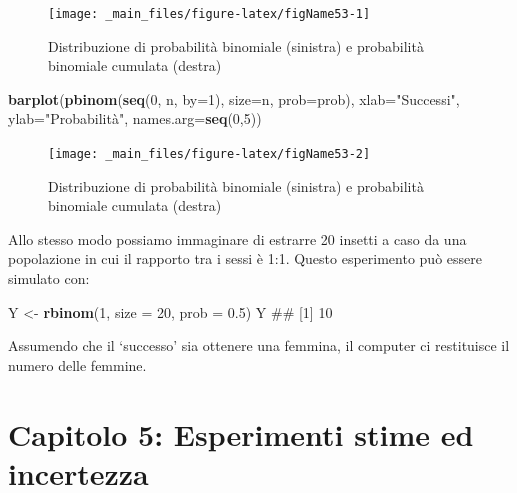 \documentclass[a4paper,12pt,oneside]{book}
\newenvironment{Shaded}{\begin{snugshade}}{\end{snugshade}}
\newcommand{\KeywordTok}[1]{\textcolor[rgb]{0.13,0.29,0.53}{\textbf{#1}}}
\newcommand{\DataTypeTok}[1]{\textcolor[rgb]{0.13,0.29,0.53}{#1}}
\newcommand{\DecValTok}[1]{\textcolor[rgb]{0.00,0.00,0.81}{#1}}
\newcommand{\FloatTok}[1]{\textcolor[rgb]{0.00,0.00,0.81}{#1}}
\newcommand{\StringTok}[1]{\textcolor[rgb]{0.31,0.60,0.02}{#1}}
\newcommand{\NormalTok}[1]{#1}
\theoremstyle{definition}
\theoremstyle{definition}
\theoremstyle{definition}
\theoremstyle{remark}
\begin{document}
\begin{figure}

{\centering \texttt{[image: \_main\_files/figure-latex/figName53-1]} 

}

\caption{Distribuzione di probabilità binomiale (sinistra) e probabilità binomiale cumulata (destra)}\label{fig:figName531}
\end{figure}

\begin{Shaded}
\begin{Highlighting}[]
\KeywordTok{barplot}\NormalTok{(}\KeywordTok{pbinom}\NormalTok{(}\KeywordTok{seq}\NormalTok{(}\DecValTok{0}\NormalTok{, n, }\DataTypeTok{by=}\DecValTok{1}\NormalTok{), }\DataTypeTok{size=}\NormalTok{n, }\DataTypeTok{prob=}\NormalTok{prob),}
          \DataTypeTok{xlab=}\StringTok{"Successi"}\NormalTok{, }\DataTypeTok{ylab=}\StringTok{"Probabilità"}\NormalTok{,}
          \DataTypeTok{names.arg=}\KeywordTok{seq}\NormalTok{(}\DecValTok{0}\NormalTok{,}\DecValTok{5}\NormalTok{))}
\end{Highlighting}
\end{Shaded}

\begin{figure}

{\centering \texttt{[image: \_main\_files/figure-latex/figName53-2]} 

}

\caption{Distribuzione di probabilità binomiale (sinistra) e probabilità binomiale cumulata (destra)}\label{fig:figName532}
\end{figure}

Allo stesso modo possiamo immaginare di estrarre 20 insetti a caso da
una popolazione in cui il rapporto tra i sessi è 1:1. Questo esperimento
può essere simulato con:

\begin{Shaded}
\begin{Highlighting}[]
\NormalTok{Y <-}\StringTok{ }\KeywordTok{rbinom}\NormalTok{(}\DecValTok{1}\NormalTok{, }\DataTypeTok{size =} \DecValTok{20}\NormalTok{, }\DataTypeTok{prob =} \FloatTok{0.5}\NormalTok{)}
\NormalTok{Y}
\NormalTok{## [1] 10}
\end{Highlighting}
\end{Shaded}

Assumendo che il `successo' sia ottenere una femmina, il computer ci
restituisce il numero delle femmine.

\section{Capitolo 5: Esperimenti stime ed
incertezza}\label{capitolo-5-esperimenti-stime-ed-incertezza}
\end{document}
